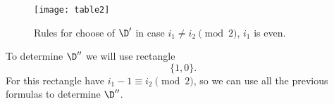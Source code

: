 \begin{figure}[ht]
	\centering
	\texttt{[image: table2]}
	\caption{Rules for choose of $\D'$ in case $i_1 \ne i_2 \pmod 2$, $i_1$ is even.}
	\label{table2}
\end{figure}

To determine $\D''$ we will use rectangle
$$\{1, 0\}.$$
For this rectangle have $i_1 - 1 \equiv i_2 \pmod 2$, so we can use all the previous formulas to determine $\D''$.
